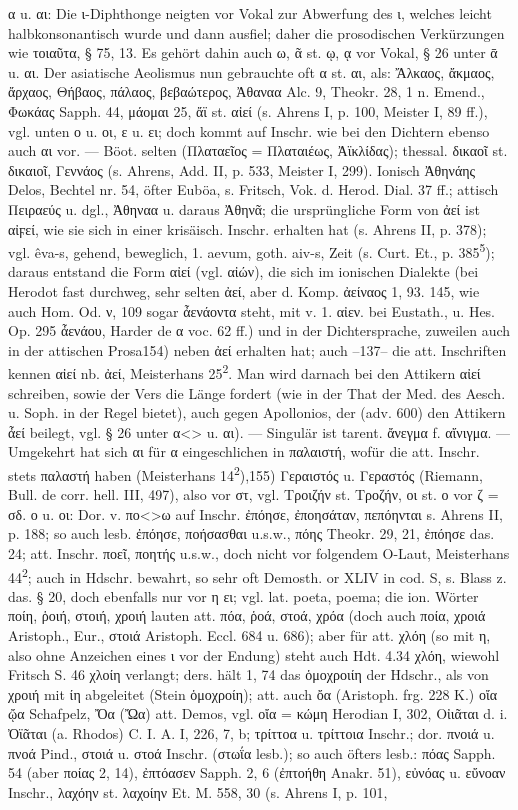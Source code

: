 α u. αι: Die ι-Diphthonge neigten vor Vokal zur Abwerfung des ι, welches leicht halbkonsonantisch wurde und dann ausfiel; daher die prosodischen Verkürzungen wie τοιαῦτα, § 75, 13. Es gehört dahin auch ω, ᾶ st. ῳ, ᾳ vor Vokal, § 26 unter ᾱ u. αι. Der asiatische Aeolismus nun gebrauchte oft α st. αι, als: Ἄλκαος, ἄκμαος, ἄρχαος, Θήβαος, πάλαος, βεβαώτερος, Ἀθαναα Alc. 9, Theokr. 28, 1 n. Emend., Φωκάας Sapph. 44, μάομαι 25, ἄϊ st. αἰεί (s. Ahrens I, p. 100, Meister I, 89 ff.), vgl. unten ο u. οι, ε u. ει; doch kommt auf Inschr. wie bei den Dichtern ebenso auch αι vor. — Böot. selten (Πλαταεῖος = Πλαταιέως, Ἀϊκλίδας); thessal. δικαοῖ st. δικαιοῖ, Γεννάος (s. Ahrens, Add. II, p. 533, Meister I, 299). Ionisch Ἀθηνάης Delos, Bechtel nr. 54, öfter Euböa, s. Fritsch, Vok. d. Herod. Dial. 37 ff.; attisch Πειραεύς u. dgl., Ἀθηναα u. daraus Ἀθηνᾶ; die ursprüngliche Form von ἀεί ist αἰϝεί, wie sie sich in einer krisäisch. Inschr. erhalten hat (s. Ahrens II, p. 378); vgl. êva-s, gehend, beweglich, 1. aevum, goth. aiv-s, Zeit (s. Curt. Et., p. 385\textsuperscript{5}); daraus entstand die Form αἰεί (vgl. αἰών), die sich im ionischen Dialekte (bei Herodot fast durchweg, sehr selten ἀεί, aber d. Komp. ἀείναος 1, 93. 145, wie auch Hom. Od. ν, 109 sogar ἆενάοντα steht, mit v. 1. αἰεν. bei Eustath., u. Hes. Op. 295 ἆενάου, Harder de α voc. 62 ff.) und in der Dichtersprache, zuweilen auch in der attischen Prosa154) neben ἀεί erhalten hat; auch --137-- die att. Inschriften kennen αἰεί nb. ἀεί, Meisterhans 25\textsuperscript{2}. Man wird darnach bei den Attikern αἰεί schreiben, sowie der Vers die Länge fordert (wie in der That der Med. des Aesch. u. Soph. in der Regel bietet), auch gegen Apollonios, der (adv. 600) den Attikern ἆεί beilegt, vgl. § 26 unter α<> u. αι). — Singulär ist tarent. ἄνεγμα f. αἴνιγμα. — Umgekehrt hat sich αι für α eingeschlichen in παλαιστή, wofür die att. Inschr. stets παλαστή haben (Meisterhans 14\textsuperscript{2}),155) Γεραιστός u. Γεραστός (Riemann, Bull. de corr. hell. III, 497), also vor στ, vgl. Τροιζήν st. Τροζήν, οι st. ο vor ζ = σδ. ο u. οι: Dor. v. πο<>ω auf Inschr. ἐπόησε, ἐποησάταν, πεπόηνται s. Ahrens II, p. 188; so auch lesb. ἐπόησε, ποήσασθαι u.s.w., πόης Theokr. 29, 21, ἐπόησε das. 24; att. Inschr. ποεῖ, ποητής u.s.w., doch nicht vor folgendem O-Laut, Meisterhans 44\textsuperscript{2}; auch in Hdschr. bewahrt, so sehr oft Demosth. or XLIV in cod. S, s. Blass z. das. § 20, doch ebenfalls nur vor η ει; vgl. lat. poeta, poema; die ion. Wörter ποίη, ῥοιή, στοιή, χροιή lauten att. πόα, ῥοά, στοά, χρόα (doch auch ποία, χροιά Aristoph., Eur., στοιά Aristoph. Eccl. 684 u. 686); aber für att. χλόη (so mit η, also ohne Anzeichen eines ι vor der Endung) steht auch Hdt. 4.34 χλόη, wiewohl Fritsch S. 46 χλοίη verlangt; ders. hält 1, 74 das ὁμοχροιίη der Hdschr., als von χροιή mit ίη abgeleitet (Stein ὁμοχροίη); att. auch ὄα (Aristoph. frg. 228 K.) οἴα ᾤα Schafpelz, Ὄα (Ὤα) att. Demos, vgl. οἴα = κώμη Herodian Ι, 302, Οἰιᾶται d. i. Ὀϊᾶται (a. Rhodos) C. I. A. I, 226, 7, b; τρίττοα u. τρίττοια Inschr.; dor. πνοιά u. πνοά Pind., στοιά u. στοά Inschr. (στωΐα lesb.); so auch öfters lesb.: πόας Sapph. 54 (aber ποίας 2, 14), ἐπτόασεν Sapph. 2, 6 (ἐπτοήθη Anakr. 51), εὐνόας u. εὔνοαν Inschr., λαχόην st. λαχοίην Et. M. 558, 30 (s. Ahrens I, p. 101, 